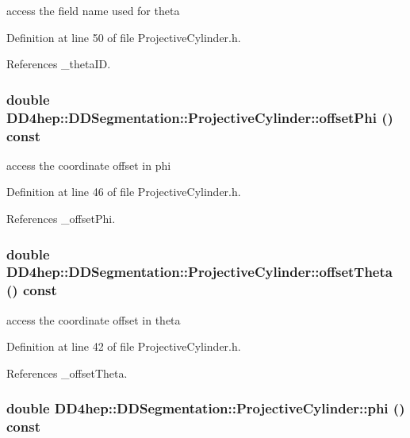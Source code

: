 access the field name used for theta 

Definition at line 50 of file ProjectiveCylinder.h.

References \_\-thetaID.\hypertarget{class_d_d4hep_1_1_d_d_segmentation_1_1_projective_cylinder_aa73aa70d947b5d3271d80d841cb6c828}{
\subsubsection[{offsetPhi}]{\setlength{\rightskip}{0pt plus 5cm}double DD4hep::DDSegmentation::ProjectiveCylinder::offsetPhi () const}}
\label{class_d_d4hep_1_1_d_d_segmentation_1_1_projective_cylinder_aa73aa70d947b5d3271d80d841cb6c828}


access the coordinate offset in phi 

Definition at line 46 of file ProjectiveCylinder.h.

References \_\-offsetPhi.\hypertarget{class_d_d4hep_1_1_d_d_segmentation_1_1_projective_cylinder_a6e3faef329e433f8342e8e35c4a6b706}{
\subsubsection[{offsetTheta}]{\setlength{\rightskip}{0pt plus 5cm}double DD4hep::DDSegmentation::ProjectiveCylinder::offsetTheta () const}}
\label{class_d_d4hep_1_1_d_d_segmentation_1_1_projective_cylinder_a6e3faef329e433f8342e8e35c4a6b706}


access the coordinate offset in theta 

Definition at line 42 of file ProjectiveCylinder.h.

References \_\-offsetTheta.\hypertarget{class_d_d4hep_1_1_d_d_segmentation_1_1_projective_cylinder_a923b730c4a4dcd0df3be0372825bab23}{
\subsubsection[{phi}]{\setlength{\rightskip}{0pt plus 5cm}double DD4hep::DDSegmentation::ProjectiveCylinder::phi () const}}
\label{class_d_d4hep_1_1_d_d_segmentation_1_1_projective_cylinder_a923b730c4a4dcd0df3be0372825bab23}


